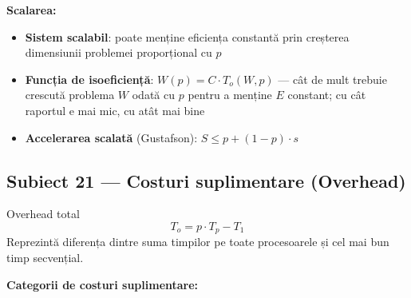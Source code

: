 \documentclass[a4paper,11pt]{article}
\newcommand{\subiect}[2]{\subsection{Subiect \textcolor{numcol}{#1} — #2}}
\begin{document}
\textbf{Scalarea:}
\begin{itemize}[noitemsep]
  \item \textbf{Sistem scalabil}: poate menține eficiența constantă prin creșterea dimensiunii problemei proporțional cu $p$
  \item \textbf{Funcția de isoeficiență}: $W(p) = C \cdot T_o(W, p)$ — cât de mult trebuie crescută problema $W$ odată cu $p$ pentru a menține $E$ constant; cu cât raportul e mai mic, cu atât mai bine
  \item \textbf{Accelerarea scalată} (Gustafson): $S \leq p + (1-p) \cdot s$
\end{itemize}

\subiect{21}{Costuri suplimentare (Overhead)}

\begin{defbox}{Overhead total}
\[
T_o = p \cdot T_p - T_1
\]
Reprezintă diferența dintre suma timpilor pe toate procesoarele și cel mai bun timp secvențial.
\end{defbox}

\textbf{Categorii de costuri suplimentare:}
\end{document}
